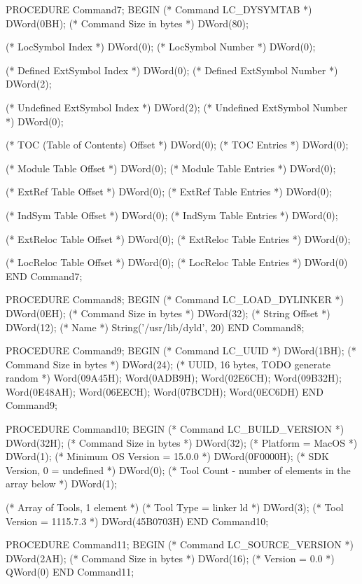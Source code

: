 \documentclass[utf8]{lgu}
\begin{document}
\begin{modula2long}
PROCEDURE Command7;
BEGIN
  (* Command LC_DYSYMTAB *)
  DWord(0BH);
  (* Command Size in bytes *)
  DWord(80);

  (* LocSymbol Index *)
  DWord(0);
  (* LocSymbol Number *)
  DWord(0);

  (* Defined ExtSymbol Index *)
  DWord(0);
  (* Defined ExtSymbol Number *)
  DWord(2);

  (* Undefined ExtSymbol Index *)
  DWord(2);
  (* Undefined ExtSymbol Number *)
  DWord(0);

  (* TOC (Table of Contents) Offset *)
  DWord(0);
  (* TOC Entries *)
  DWord(0);

  (* Module Table Offset *)
  DWord(0);
  (* Module Table Entries *)
  DWord(0);

  (* ExtRef Table Offset *)
  DWord(0);
  (* ExtRef Table Entries *)
  DWord(0);

  (* IndSym Table Offset *)
  DWord(0);
  (* IndSym Table Entries *)
  DWord(0);

  (* ExtReloc Table Offset *)
  DWord(0);
  (* ExtReloc Table Entries *)
  DWord(0);

  (* LocReloc Table Offset *)
  DWord(0);
  (* LocReloc Table Entries *)
  DWord(0)
END Command7;

PROCEDURE Command8;
BEGIN
  (* Command LC_LOAD_DYLINKER *)
  DWord(0EH);
  (* Command Size in bytes *)
  DWord(32);
  (* String Offset *)
  DWord(12);
  (* Name *)
  String('/usr/lib/dyld', 20)
END Command8;

PROCEDURE Command9;
BEGIN
  (* Command LC_UUID *)
  DWord(1BH);
  (* Command Size in bytes *)
  DWord(24);
  (* UUID, 16 bytes, TODO generate random *)
  Word(09A45H); Word(0ADB9H); Word(02E6CH); Word(09B32H);
  Word(0E48AH); Word(06EECH); Word(07BCDH); Word(0EC6DH)
END Command9;

PROCEDURE Command10;
BEGIN
  (* Command LC_BUILD_VERSION *)
  DWord(32H);
  (* Command Size in bytes *)
  DWord(32);
  (* Platform = MacOS *)
  DWord(1);
  (* Minimum OS Version = 15.0.0 *)
  DWord(0F0000H);
  (* SDK Version, 0 = undefined *)
  DWord(0);
  (* Tool Count - number of elements in the array below *)
  DWord(1);

  (* Array of Tools, 1 element *)
  (* Tool Type = linker ld *)
  DWord(3);
  (* Tool Version = 1115.7.3 *)
  DWord(45B0703H)
END Command10;

PROCEDURE Command11;
BEGIN
  (* Command LC_SOURCE_VERSION *)
  DWord(2AH);
  (* Command Size in bytes *)
  DWord(16);
  (* Version = 0.0 *)
  QWord(0)
END Command11;


\end{modula2long}
\end{document}
